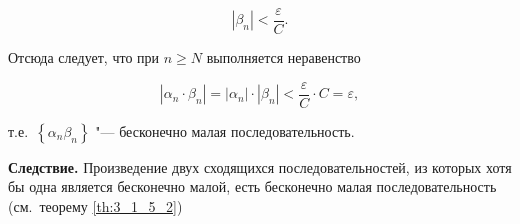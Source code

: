 \begin{equation*}
\displaystyle \left| \beta_{n} \right| < \frac{\varepsilon}{C}.
\end{equation*}

\noindent
Отсюда следует, что при $n \geqslant N$ выполняется неравенство

\begin{equation*}
\left| \alpha_{n} \cdot \beta_{n} \right| =
\left| \alpha_{n} \right| \cdot \left| \beta_{n} \right| <
\displaystyle \frac{\varepsilon}{C} \cdot C = \varepsilon,
\end{equation*}

\noindent
т.е.\ $\left\{ \alpha_{n}\beta_{n} \right\}$ "--- бесконечно малая последовательность.

\textbf{Следствие.} Произведение двух сходящихся последовательностей,
из которых хотя бы одна является бесконечно малой,
есть бесконечно малая последовательность
(см.\ теорему \ref{th:3_1_5_2})

